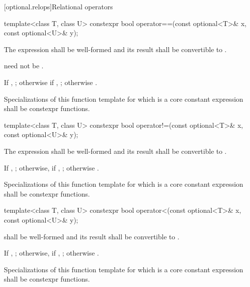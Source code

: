 [optional.relops]{Relational operators}

%
\begin{itemdecl}
template<class T, class U> constexpr bool operator==(const optional<T>& x, const optional<U>& y);
\end{itemdecl}

\begin{itemdescr}
\pnum
\requires
The expression  shall be well-formed and
its result shall be convertible to .
\begin{note}
 need not be .
\end{note}

\pnum
\returns
If , ; otherwise if , ; otherwise .

\pnum
\remarks
Specializations of this function template
for which  is a core constant expression
shall be constexpr functions.
\end{itemdescr}

%
\begin{itemdecl}
template<class T, class U> constexpr bool operator!=(const optional<T>& x, const optional<U>& y);
\end{itemdecl}

\begin{itemdescr}
\pnum
\requires
The expression  shall be well-formed and
its result shall be convertible to .

\pnum
\returns
If , ;
otherwise, if , ;
otherwise .

\pnum
\remarks
Specializations of this function template
for which  is a core constant expression
shall be constexpr functions.
\end{itemdescr}

%
\begin{itemdecl}
template<class T, class U> constexpr bool operator<(const optional<T>& x, const optional<U>& y);
\end{itemdecl}

\begin{itemdescr}
\pnum
\requires
{} shall be well-formed
and its result shall be convertible to .

\pnum
\returns
If , ;
otherwise, if , ;
otherwise .

\pnum
\remarks
Specializations of this function template
for which  is a core constant expression
shall be constexpr functions.
\end{itemdescr}

